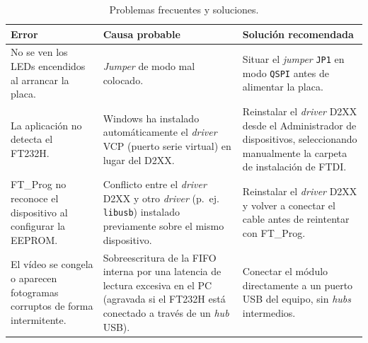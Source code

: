 \begin{table}[htbp]
\centering
\caption{Problemas frecuentes y soluciones.}
\label{tab:errores_frecuentes}
\begin{tabular}{|p{3.8cm}|p{4.6cm}|p{4.6cm}|}
\hline
\rowcolor[HTML]{156082}
{\color{white}\textbf{Error}} & {\color{white}\textbf{Causa probable}} & {\color{white}\textbf{Solución recomendada}} \\ \hline
No se ven los LEDs encendidos al arrancar la placa. & \textit{Jumper} de modo mal colocado. & Situar el \textit{jumper} \texttt{JP1} en modo \texttt{QSPI} antes de alimentar la placa. \\ \hline
La aplicación no detecta el FT232H. & Windows ha instalado automáticamente el \textit{driver} VCP (puerto serie virtual) en lugar del D2XX. & Reinstalar el \textit{driver} D2XX desde el Administrador de dispositivos, seleccionando manualmente la carpeta de instalación de FTDI. \\ \hline
FT\_Prog no reconoce el dispositivo al configurar la \ac{EEPROM}. & Conflicto entre el \textit{driver} D2XX y otro \textit{driver} (p.~ej. \texttt{libusb}) instalado previamente sobre el mismo dispositivo. & Reinstalar el \textit{driver} D2XX y volver a conectar el cable antes de reintentar con FT\_Prog. \\ \hline
El vídeo se congela o aparecen fotogramas corruptos de forma intermitente. & Sobreescritura de la \ac{FIFO} interna por una latencia de lectura excesiva en el PC (agravada si el FT232H está conectado a través de un \textit{hub} USB). & Conectar el módulo directamente a un puerto USB del equipo, sin \textit{hubs} intermedios. \\ \hline
\end{tabular}
\end{table}